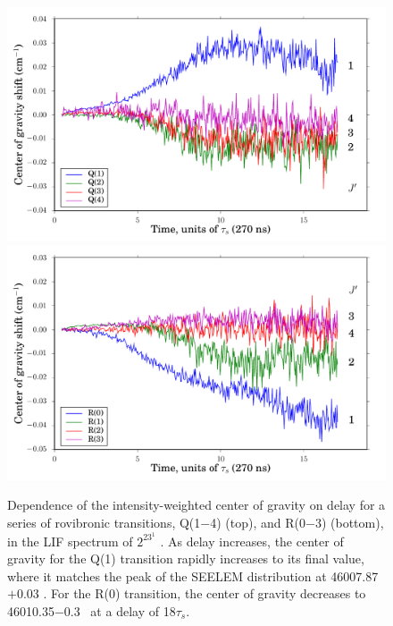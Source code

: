 \begin{figure}
  \caption{Dependence of the intensity-weighted center of gravity on
    delay for a series of rovibronic transitions, Q(1$-$4) (top), and
    R(0$-$3) (bottom), in the LIF spectrum of $2^23^1$ .  As
    delay increases, the center of gravity for the Q(1) transition
    rapidly increases to its final value, where it matches the peak of
    the SEELEM distribution at 46007.87$+$0.03 \rcm.  For the R(0)
    transition, the center of gravity decreases to 46010.35$-$0.3
    \rcm\ at a delay of 18$\tau_s$.}
  \label{fig:2231-cog-delay}
  \centering
  \vspace{5mm}
  \includegraphics[width=6in]{2231-q1234-cog-delay.pdf}
  \includegraphics[width=6in]{2231-r0123-cog-delay.pdf}
\end{figure}



